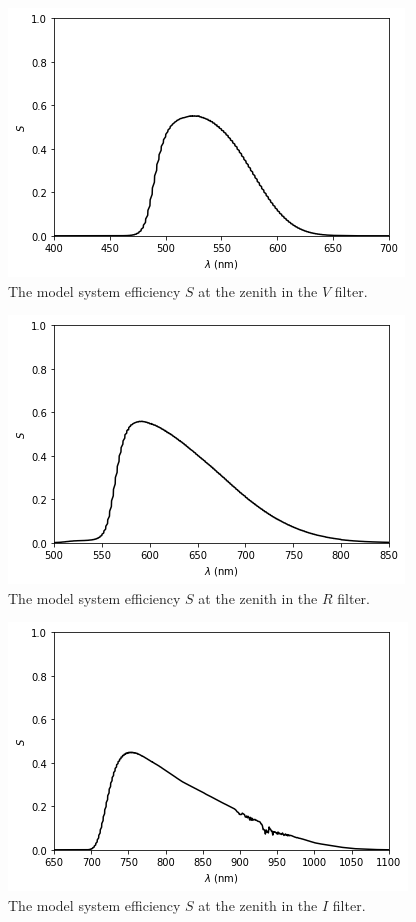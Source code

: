 \begin{figure}
\begin{center}
\includegraphics[width=0.7\linewidth]{figures/huitzi-S-JC-V.png}
\medskip
\caption{The model system efficiency $S$ at the zenith in the $V$ filter.}
\end{center}
\end{figure}

\begin{figure}
\begin{center}
\includegraphics[width=0.7\linewidth]{figures/huitzi-S-JC-R.png}
\medskip
\caption{The model system efficiency $S$ at the zenith in the $R$ filter.}
\end{center}
\end{figure}

\begin{figure}
\begin{center}
\includegraphics[width=0.7\linewidth]{figures/huitzi-S-JC-I.png}
\medskip
\caption{The model system efficiency $S$ at the zenith in the $I$ filter.}
\end{center}
\end{figure}


